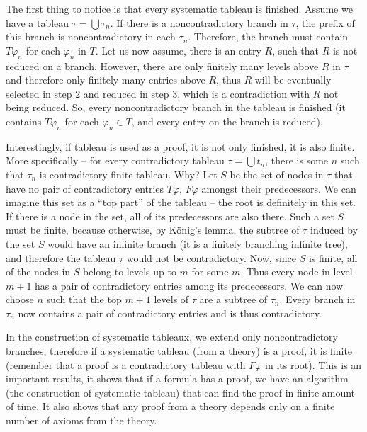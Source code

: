 The first thing to notice is that every systematic tableau is finished. Assume we have a tableau $\tau = \bigcup \tau_n$. If there is a noncontradictory branch in $\tau$, the prefix of this branch is noncontradictory in each $\tau_n$. Therefore, the branch must contain $T \varphi_n$ for each $\varphi_n$ in $T$. Let us now assume, there is an entry $R$, such that $R$ is not reduced on a branch. However, there are only finitely many levels above $R$ in $\tau$ and therefore only finitely many entries above $R$, thus $R$ will be eventually selected in step 2 and reduced in step 3, which is a contradiction with $R$ not being reduced. So, every noncontradictory branch in the tableau is finished (it contains $T \varphi_n$ for each $\varphi_n \in T$, and every entry on the branch is reduced).

Interestingly, if tableau is used as a proof, it is not only finished, it is also finite. More specifically -- for every contradictory tableau $\tau = \bigcup t_n$, there is some $n$ such that $\tau_n$ is contradictory finite tableau. Why? Let $S$ be the set of nodes in $\tau$ that have no pair of contradictory entries $T \varphi$, $F \varphi$ amongst their predecessors. We can imagine this set as a ``top part'' of the tableau -- the root is definitely in this set. If there is a node in the set, all of its predecessors are also there. Such a set $S$ must be finite, because otherwise, by König's lemma, the subtree of $\tau$ induced by the set $S$ would have an infinite branch (it is a finitely branching infinite tree), and therefore the tableau $\tau$ would not be contradictory. Now, since $S$ is finite, all of the nodes in $S$ belong to levels up to $m$ for some $m$. Thus every node in level $m+1$ has a pair of contradictory entries among its predecessors. We can now choose $n$ such that the top $m+1$ levels of $\tau$ are a subtree of $\tau_n$. Every branch in $\tau_n$ now contains a pair of contradictory entries and is thus contradictory.

In the construction of systematic tableaux, we extend only noncontradictory branches, therefore if a systematic tableau (from a theory) is a proof, it is finite (remember that a proof is a contradictory tableau with $F \varphi$ in its root). This is an important results, it shows that if a formula has a proof, we have an algorithm (the construction of systematic tableau) that can find the proof in finite amount of time. It also shows that any proof from a theory depends only on a finite number of axioms from the theory. 

